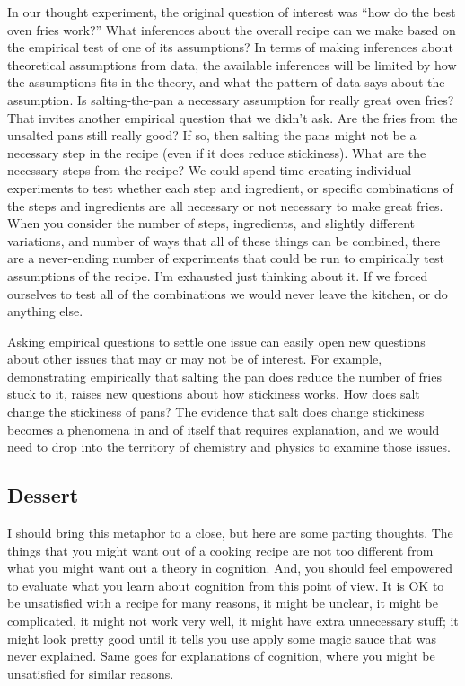 \documentclass[
  oneside,
  12pt]{crumpbook}
\begin{document}
In our thought experiment, the original question of interest was ``how do the best oven fries work?'' What inferences about the overall recipe can we make based on the empirical test of one of its assumptions? In terms of making inferences about theoretical assumptions from data, the available inferences will be limited by how the assumptions fits in the theory, and what the pattern of data says about the assumption. Is salting-the-pan a necessary assumption for really great oven fries? That invites another empirical question that we didn't ask. Are the fries from the unsalted pans still really good? If so, then salting the pans might not be a necessary step in the recipe (even if it does reduce stickiness). What are the necessary steps from the recipe? We could spend time creating individual experiments to test whether each step and ingredient, or specific combinations of the steps and ingredients are all necessary or not necessary to make great fries. When you consider the number of steps, ingredients, and slightly different variations, and number of ways that all of these things can be combined, there are a never-ending number of experiments that could be run to empirically test assumptions of the recipe. I'm exhausted just thinking about it. If we forced ourselves to test all of the combinations we would never leave the kitchen, or do anything else.

Asking empirical questions to settle one issue can easily open new questions about other issues that may or may not be of interest. For example, demonstrating empirically that salting the pan does reduce the number of fries stuck to it, raises new questions about how stickiness works. How does salt change the stickiness of pans? The evidence that salt does change stickiness becomes a phenomena in and of itself that requires explanation, and we would need to drop into the territory of chemistry and physics to examine those issues.

\hypertarget{dessert}{%
\subsection{Dessert}\label{dessert}}

I should bring this metaphor to a close, but here are some parting thoughts. The things that you might want out of a cooking recipe are not too different from what you might want out a theory in cognition. And, you should feel empowered to evaluate what you learn about cognition from this point of view. It is OK to be unsatisfied with a recipe for many reasons, it might be unclear, it might be complicated, it might not work very well, it might have extra unnecessary stuff; it might look pretty good until it tells you use apply some magic sauce that was never explained. Same goes for explanations of cognition, where you might be unsatisfied for similar reasons.
\end{document}
